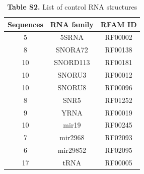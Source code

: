 \documentclass{bmcart}
\begin{document}
\begin{table}
\centering
\caption*{\textbf{Table S2.}  List of control RNA structures }
\begin{tabular}{ccc}
\hline
Sequences & RNA family & RFAM ID \\
\hline
   5 & 5SRNA & RF00002 \\
   8 & SNORA72 & RF00138 \\
  10 & SNORD113 & RF00181\\
  10 & SNORU3 & RF00012\\
  10 & SNORU8 & RF00096\\
   8 & SNR5 & RF01252\\
   9 & YRNA & RF00019\\
  10 & mir19 & RF00245\\
   7 & mir2968 & RF02093\\
   6 & mir29852 & RF02095\\
  17 & tRNA & RF00005\\
\hline
\end{tabular}
\end{table}
\end{document}
